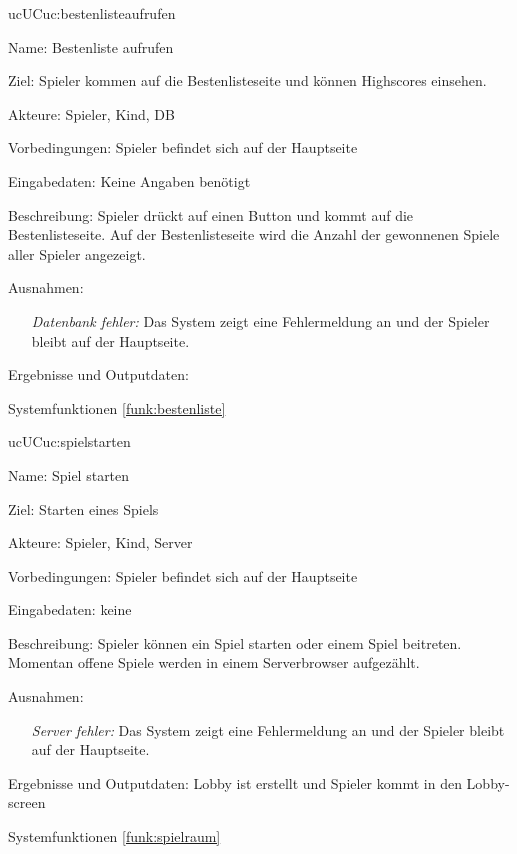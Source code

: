 \begin{description}[leftmargin=5em, style=sameline]
	\begin{lhp}{uc}{UC}{uc:bestenlisteaufrufen}
		\item [Name:] Bestenliste aufrufen
		\item [Ziel:] Spieler kommen auf die Bestenlisteseite und können Highscores einsehen.
		\item [Akteure:] Spieler, Kind, DB
		\item [Vorbedingungen:] Spieler befindet sich auf der Hauptseite
		\item [Eingabedaten:] Keine Angaben benötigt
		\item [Beschreibung:] Spieler drückt auf einen Button und kommt auf die Bestenlisteseite. Auf der Bestenlisteseite wird die Anzahl der gewonnenen Spiele aller Spieler angezeigt.
		\item [Ausnahmen:] \begin{itemize}
						\item[] \textit{Datenbank fehler:} Das System zeigt eine Fehlermeldung an und der Spieler bleibt auf der Hauptseite.
						
					\end{itemize}
		\item [Ergebnisse und Outputdaten:]
		\item [Systemfunktionen] \ref{funk:bestenliste}
	\end{lhp}

	\begin{lhp}{uc}{UC}{uc:spielstarten}
		\item [Name:] Spiel starten
		\item [Ziel:] Starten eines Spiels
		\item [Akteure:] Spieler, Kind, Server
		\item [Vorbedingungen:] Spieler befindet sich auf der Hauptseite
		\item [Eingabedaten:] keine
		\item [Beschreibung:] Spieler können ein Spiel starten oder einem Spiel beitreten. Momentan offene Spiele werden in einem Serverbrowser aufgezählt.
		\item [Ausnahmen:] \begin{itemize}
			\item[] \textit{Server fehler:} Das System zeigt eine Fehlermeldung an und der Spieler bleibt auf der Hauptseite.
		\end{itemize}
		\item [Ergebnisse und Outputdaten:] Lobby ist erstellt und Spieler kommt in den Lobby-screen
		\item [Systemfunktionen] \ref{funk:spielraum}
	\end{lhp}
	

\end{description}
